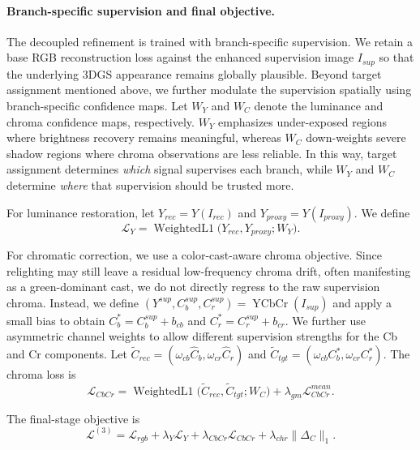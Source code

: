 \paragraph{Branch-specific supervision and final objective.}
The decoupled refinement is trained with branch-specific supervision. We retain
a base RGB reconstruction loss against the enhanced supervision image $I_{sup}$
so that the underlying 3DGS appearance remains globally plausible. Beyond target assignment mentioned above, we further modulate the supervision spatially using
branch-specific confidence maps. Let $W_Y$ and $W_C$ denote the luminance and
chroma confidence maps, respectively. $W_Y$ emphasizes under-exposed regions
where brightness recovery remains meaningful, whereas $W_C$ down-weights severe
shadow regions where chroma observations are less reliable. In this way, target
assignment determines \emph{which} signal supervises each branch, while
$W_Y$ and $W_C$ determine \emph{where} that supervision should be trusted more.

For luminance restoration, let
$Y_{rec}=Y(I_{rec})$ and $Y_{proxy}=Y(I_{proxy})$. We define
\begin{equation}
\mathcal{L}_{Y}
=
\operatorname{WeightedL1}
\big(
Y_{rec},Y_{proxy};W_Y
\big).
\end{equation}

For chromatic correction, we use a color-cast-aware chroma objective. Since
relighting may still leave a residual low-frequency chroma drift, often
manifesting as a green-dominant cast, we do not
directly regress to the raw supervision chroma. Instead, we define
$(Y^{sup},C_b^{sup},C_r^{sup})=\operatorname{YCbCr}(I_{sup})$ and apply a small
bias to obtain $C_b^{*}=C_b^{sup}+b_{cb}$ and $C_r^{*}=C_r^{sup}+b_{cr}$. We
further use asymmetric channel weights to allow different supervision strengths
for the Cb and Cr components. Let
$\tilde{C}_{rec}=(\omega_{cb}\hat C_b,\omega_{cr}\hat C_r)$ and
$\tilde{C}_{tgt}=(\omega_{cb}C_b^{*},\omega_{cr}C_r^{*})$. The chroma loss is
\begin{equation}
\mathcal{L}_{CbCr}
=
\operatorname{WeightedL1}
\big(
\tilde{C}_{rec},\tilde{C}_{tgt};W_C
\big)
+\lambda_{gm}\mathcal{L}_{CbCr}^{mean}.
\end{equation}

The final-stage objective is
\begin{equation}
\mathcal{L}^{(3)}
=
\mathcal{L}_{rgb}
+\lambda_Y \mathcal{L}_{Y}
+\lambda_{CbCr} \mathcal{L}_{CbCr}
+\lambda_{chr}\|\Delta_C\|_1.
\end{equation}
